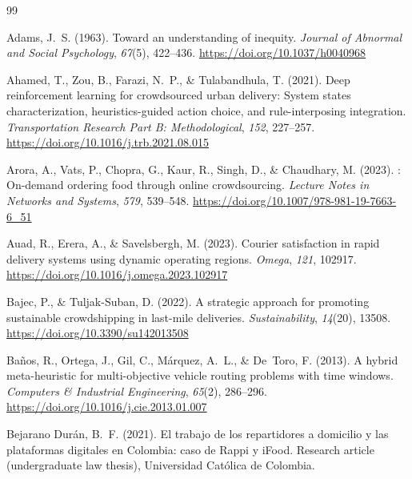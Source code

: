 \documentclass[12pt,a4paper]{report}
\begin{document}
\begin{thebibliography}{99}

Adams, J.~S. (1963).
\newblock Toward an understanding of inequity.
\newblock \textit{Journal of Abnormal and Social Psychology}, \textit{67}(5), 422--436.
\newblock \url{https://doi.org/10.1037/h0040968}

Ahamed, T., Zou, B., Farazi, N.~P., \& Tulabandhula, T. (2021).
\newblock Deep reinforcement learning for crowdsourced urban delivery: System states characterization, heuristics-guided action choice, and rule-interposing integration.
\newblock \textit{Transportation Research Part B: Methodological}, \textit{152}, 227--257.
\newblock \url{https://doi.org/10.1016/j.trb.2021.08.015}

Arora, A., Vats, P., Chopra, G., Kaur, R., Singh, D., \& Chaudhary, M. (2023).
: On-demand ordering food through online crowdsourcing.
\newblock \textit{Lecture Notes in Networks and Systems}, \textit{579}, 539--548.
\newblock \url{https://doi.org/10.1007/978-981-19-7663-6_51}

Auad, R., Erera, A., \& Savelsbergh, M. (2023).
\newblock Courier satisfaction in rapid delivery systems using dynamic operating regions.
\newblock \textit{Omega}, \textit{121}, 102917.
\newblock \url{https://doi.org/10.1016/j.omega.2023.102917}

Bajec, P., \& Tuljak-Suban, D. (2022).
\newblock A strategic approach for promoting sustainable crowdshipping in last-mile deliveries.
\newblock \textit{Sustainability}, \textit{14}(20), 13508.
\newblock \url{https://doi.org/10.3390/su142013508}

Ba\~{n}os, R., Ortega, J., Gil, C., M\'{a}rquez, A.~L., \& De~Toro, F. (2013).
\newblock A hybrid meta-heuristic for multi-objective vehicle routing problems with time windows.
\newblock \textit{Computers \& Industrial Engineering}, \textit{65}(2), 286--296.
\newblock \url{https://doi.org/10.1016/j.cie.2013.01.007}

Bejarano Dur\'{a}n, B.~F. (2021).
\newblock El trabajo de los repartidores a domicilio y las plataformas digitales en Colombia: caso de Rappi y iFood.
\newblock Research article (undergraduate law thesis), Universidad Cat\'{o}lica de Colombia.


\end{thebibliography}
\end{document}

